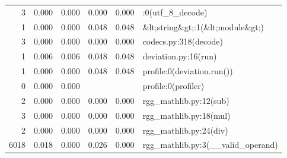 \documentclass[11pt,a4paper]{article}
\begin{document}
\begin{table}[h]
\begin{tabular}{|r|r|r|r|r|l|}
			3                                     & 0.000                                 & 0.000                                 & 0.000                                 & 0.000                                 & :0(utf\_8\_decode)                    \\ 
			1                                     & 0.000                                 & 0.000                                 & 0.048                                 & 0.048                                 & \&lt;string\&gt;:1(\&lt;module\&gt;)  \\ 
			3                                     & 0.000                                 & 0.000                                 & 0.000                                 & 0.000                                 & codecs.py:318(decode)                 \\ 
			1                                     & 0.006                                 & 0.006                                 & 0.048                                 & 0.048                                 & deviation.py:16(run)                  \\ 
			1                                     & 0.000                                 & 0.000                                 & 0.048                                 & 0.048                                 & profile:0(deviation.run())            \\ 
			0                                     & 0.000                                 & 0.000                                 &                                       &                                       & profile:0(profiler)                   \\ 
			2                                     & 0.000                                 & 0.000                                 & 0.000                                 & 0.000                                 & rgg\_mathlib.py:12(sub)               \\ 
			3                                     & 0.000                                 & 0.000                                 & 0.000                                 & 0.000                                 & rgg\_mathlib.py:18(mul)               \\ 
			2                                     & 0.000                                 & 0.000                                 & 0.000                                 & 0.000                                 & rgg\_mathlib.py:24(div)               \\ 
			6018                                  & 0.018                                 & 0.000                                 & 0.026                                 & 0.000                                 & rgg\_mathlib.py:3(\_\_valid\_operand) \\ 

\end{tabular}
\end{table}
\end{document}
